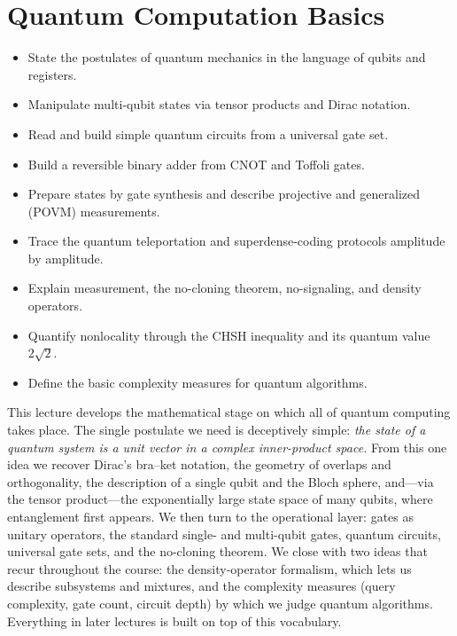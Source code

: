\chapter{Quantum Computation Basics}
\label{ch:lec01}

\begin{objectives}
\begin{itemize}[leftmargin=1.4em,nosep]
  \item State the postulates of quantum mechanics in the language of qubits and registers.
  \item Manipulate multi-qubit states via tensor products and Dirac notation.
  \item Read and build simple quantum circuits from a universal gate set.
  \item Build a reversible binary adder from CNOT and Toffoli gates.
  \item Prepare states by gate synthesis and describe projective and generalized (POVM) measurements.
  \item Trace the quantum teleportation and superdense-coding protocols amplitude by amplitude.
  \item Explain measurement, the no-cloning theorem, no-signaling, and density operators.
  \item Quantify nonlocality through the CHSH inequality and its quantum value $2\sqrt2$.
  \item Define the basic complexity measures for quantum algorithms.
\end{itemize}
\end{objectives}


This lecture develops the mathematical stage on which all of quantum computing
takes place. The single postulate we need is deceptively simple: \emph{the state
of a quantum system is a unit vector in a complex inner-product space.} From this
one idea we recover Dirac's bra--ket notation, the geometry of overlaps and
orthogonality, the description of a single qubit and the Bloch sphere, and---via
the tensor product---the exponentially large state space of many qubits, where
entanglement first appears. We then turn to the operational layer: gates as
unitary operators, the standard single- and multi-qubit gates, quantum circuits,
universal gate sets, and the no-cloning theorem. We close with two ideas that
recur throughout the course: the density-operator formalism, which lets us
describe subsystems and mixtures, and the complexity measures (query complexity,
gate count, circuit depth) by which we judge quantum algorithms. Everything in
later lectures is built on top of this vocabulary.

